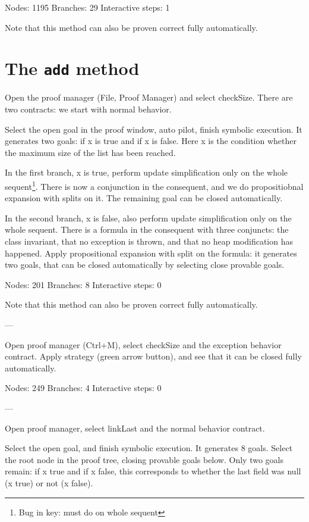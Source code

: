 \documentclass[runningheads]{llncs}
\begin{document}
Nodes: 1195
Branches: 29
Interactive steps: 1

Note that this method can also be proven correct fully automatically.

\section{The \texttt{add} method}\label{sec:add}

Open the proof manager (File, Proof Manager) and select checkSize. There are two contracts: we start with normal behavior.

Select the open goal in the proof window, auto pilot, finish symbolic execution. It generates two goals: if x is true and if x is false. Here x is the condition whether the maximum size of the list has been reached.

In the first branch, x is true, perform update simplification only on the whole sequent\footnote{Bug in key: must do on whole sequent}. There is now a conjunction in the consequent, and we do propositiobnal expansion with splits on it. The remaining goal can be closed automatically.

In the second branch, x is false, also perform update simplification only on the whole sequent. There is a formula in the consequent with three conjuncts: the class invariant, that no exception is thrown, and that no heap modification has happened. Apply propositional expansion with split on the formula: it generates two goals, that can be closed automatically by selecting close provable goals.

Nodes: 201
Branches: 8
Interactive steps: 0

Note that this method can also be proven correct fully automatically.

---

Open proof manager (Ctrl+M), select checkSize and the exception behavior contract. Apply strategy (green arrow button), and see that it can be closed fully automatically.

Nodes: 249
Branches: 4
Interactive steps: 0

---

Open proof manager, select linkLast and the normal behavior contract.

Select the open goal, and finish symbolic execution. It generates 8 goals. Select the root node in the proof tree, closing provable goals below. Only two goals remain: if x true and if x false, this corresponds to whether the last field was null (x true) or not (x false).
\end{document}
